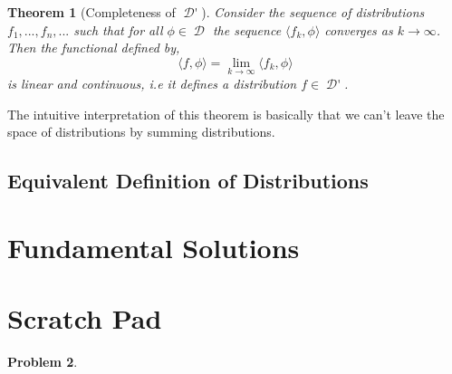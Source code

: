 \documentclass[12pt, a4]{article}
\newtheorem{theorem}{Theorem}[section]
\newtheorem{problem}[theorem]{Problem}
\DeclareMathOperator\tfspaceD{\mathcal{D}}
\DeclareMathOperator\dist{\mathcal{D'}}
\begin{document}
\begin{theorem}[Completeness of $\dist$]
    Consider the sequence of distributions $f_1,...,f_n,...$ such that for all $\phi \in \tfspaceD$ the sequence $\langle f_k, \phi \rangle$ converges as $k \rightarrow \infty$. Then the functional defined by, \[ \langle f, \phi \rangle = \lim_{k \rightarrow \infty} \langle f_k, \phi \rangle \] is linear and continuous, i.e it defines a distribution $f \in \dist$.
\end{theorem}

The intuitive interpretation of this theorem is basically that we can't leave the space of distributions by summing distributions.

\subsection{Equivalent Definition of Distributions}


\section{Fundamental Solutions}


\section{Scratch Pad}

\begin{problem}

\end{problem}
\end{document}
